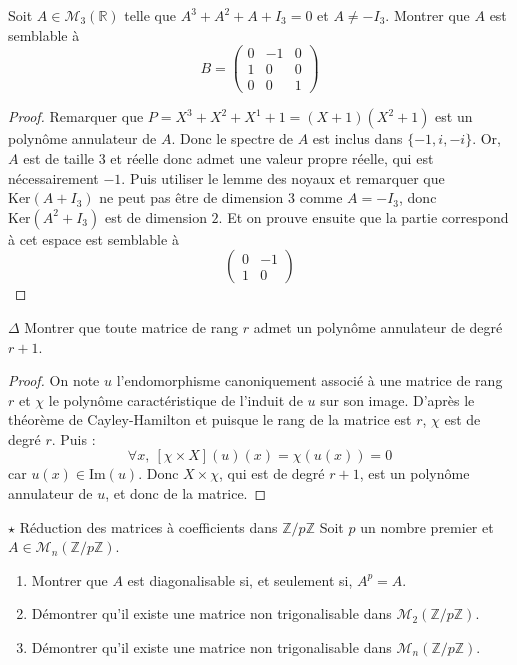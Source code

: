 \documentclass[french,a4paper]{article}
\newcommand{\Z}{\mathbb{Z}}
\newcommand{\R}{\mathbb{R}}
\renewcommand{\ker}{\text{Ker}}
\newcommand{\im}{\text{Im}}
\theoremstyle{plain}
\theoremstyle{definition}
\theoremstyle{remark}
\begin{document}
\begin{ex}{}
	Soit $A\in\mathcal{M}_3(\R)$ telle que $A^3+A^2+A+I_3=0$ et $A\ne -I_3$. Montrer que $A$ est semblable à $$B=\begin{pmatrix}
		0&-1&0\\
		1&0&0\\
		0&0&1
	\end{pmatrix}$$
\end{ex}
\begin{proof}
	Remarquer que $P=X^3+X^2+X^1+1=(X+1)(X^2+1)$ est un polynôme annulateur de $A$. Donc le spectre de $A$ est inclus dans $\{-1,i,-i\}$. Or, $A$ est de taille 3 et réelle donc admet une valeur propre réelle, qui est nécessairement $-1$. Puis utiliser le lemme des noyaux et remarquer que $\ker(A+I_3)$ ne peut pas être de dimension $3$ comme $A=-I_3$, donc $\ker(A^2+I_3)$ est de dimension $2$. Et on prouve ensuite que la partie correspond à cet espace est semblable à $$\begin{pmatrix}
		0&-1\\
		1&0
	\end{pmatrix}$$
\end{proof}

\begin{ex}{$\Delta$}
	Montrer que toute matrice de rang $r$ admet un polynôme annulateur de degré $r+1$.
\end{ex}
\begin{proof}
	On note $u$ l'endomorphisme canoniquement associé à une matrice de rang $r$ et $\chi$ le polynôme caractéristique de l'induit de $u$ sur son image. D'après le théorème de Cayley-Hamilton et puisque le rang de la matrice est $r$, $\chi$ est de degré $r$. Puis : $$\forall x,\ \left[\chi \times X\right](u)(x)=\chi(u(x))=0$$ car $u(x)\in\im(u)$. Donc $X\times\chi$, qui est de degré $r+1$, est un polynôme annulateur de $u$, et donc de la matrice.
\end{proof}

\begin{ex}[Châteaux]{$\star$ Réduction des matrices à coefficients dans $\Z/p\Z$}
	Soit $p$ un nombre premier et $A\in\mathcal{M}_n(\Z/p\Z)$.
	\begin{enumerate}
		\item Montrer que $A$ est diagonalisable si, et seulement si, $A^p=A$.
		\item Démontrer qu'il existe une matrice non trigonalisable dans $\mathcal{M}_2(\Z/p\Z)$.
		\item Démontrer qu'il existe une matrice non trigonalisable dans $\mathcal{M}_n(\Z/p\Z)$.
	\end{enumerate}
\end{ex}
\end{document}
